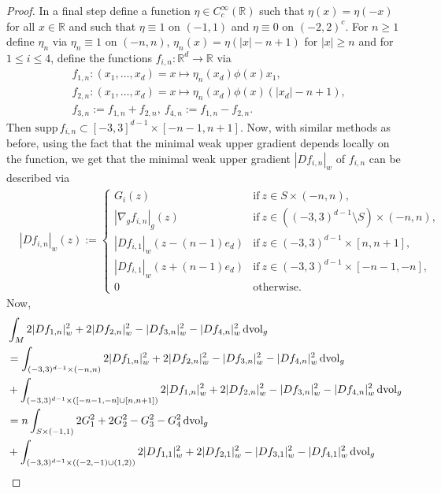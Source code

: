 \documentclass[a4paper,10pt]{article}
\numberwithin{equation}{section}
\newcommand{\R}{\mathbb{R}}
\newcommand{\supp}{\mathrm{supp}}
\newcommand{\vol}{\mathrm{vol}}
\newcommand{\di}{{\rm d}}
\begin{document}
\begin{proof}
In a final step define a function $\eta \in C_c^\infty(\R)$ such that $\eta(x) = \eta(-x)$ for all $x \in \R$ and such that $\eta \equiv 1$ on $(-1, 1)$ and $\eta \equiv 0$ on $(-2, 2)^c$. For $n\geq 1$ define $\eta_n$ via $\eta_n \equiv 1$ on $(-n, n)$, $\eta_n(x)= \eta(|x|-n+1)$ for $|x| \geq n$ and for $1 \leq i \leq 4$, define the functions $f_{i, n}:\R^d\to \R$ via 
\begin{align*}
    &f_{1, n}: (x_1, \ldots, x_d) =x \mapsto \eta_n(x_d)\phi(x) x_1, \\
    &f_{2, n}: (x_1, \ldots, x_d) =x \mapsto \eta_n(x_d)\phi(x) (|x_d|-n+1),\\
    &f_{3, n} := f_{1, n} + f_{2, n}, \ f_{4, n} := f_{1, n} - f_{2, n}.
\end{align*}
Then $\supp \, f_{i, n} \subset [-3, 3]^{d-1} \times [-n-1, n+1]$. 
Now, with similar methods as before, using the fact that the minimal weak upper gradient depends locally on the function, we get that the minimal weak upper gradient $|Df_{i,n}|_w$ of $f_{i, n}$ can be described via
\begin{align*}
     &|Df_{i,n}|_w(z):= \left\{ \begin{array}{ll}
           G_i(z) & \mathrm{if}\ z \in S \times (-n, n), \\
           |\nabla_g f_{i, n}|_g(z) & \mathrm{if}\ z \in ((-3, 3)^{d-1}\setminus S) \times (-n, n), \\
           |Df_{i,1}|_w(z-(n-1)e_d) &\mathrm{if}\ z \in (-3, 3)^{d-1} \times [n, n+1], \\
            |Df_{i,1}|_w(z+(n-1)e_d) &\mathrm{if}\ z \in (-3, 3)^{d-1} \times [-n-1, -n], \\
            0 & \mathrm{otherwise}.
        \end{array}\right.
\end{align*}
Now, 
\begin{align*}
    &\int_M 2|Df_{1,n}|^2_w +2|Df_{2,n}|^2_w-|Df_{3,n}|^2_w-|Df_{4,n}|^2_w \,\di \vol_g \\
    &=  \int_{(-3, 3)^{d-1}\times (-n, n)} 2|Df_{1,n}|^2_w +2|Df_{2,n}|^2_w-|Df_{3,n}|^2_w-|Df_{4,n}|^2_w \,\di \vol_g \\
    &+ \int_{(-3, 3)^{d-1}\times( [-n-1, -n] \cup [n, n+1])} 2|Df_{1,n}|^2_w +2|Df_{2,n}|^2_w-|Df_{3,n}|^2_w-|Df_{4,n}|^2_w \,\di \vol_g \\
    &= n\int_{S\times (-1, 1)} 2G_1^2 +2G_2^2-G_3^2-G_4^2\, \di \vol_g \\
    &+ \int_{(-3, 3)^{d-1}\times((-2, -1)\cup (1, 2))} 2|Df_{1,1}|^2_w +2|Df_{2,1}|^2_w-|Df_{3,1}|^2_w-|Df_{4,1}|^2_w \,\di \vol_g\\

\end{align*}
\end{proof}
\end{document}
